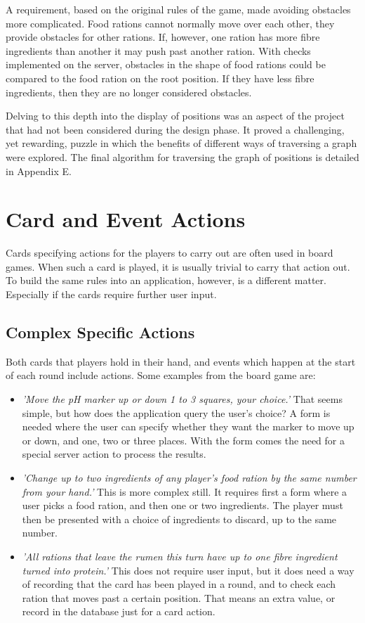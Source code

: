 A requirement, based on the original rules of the game, made avoiding obstacles more complicated. Food rations cannot normally move over each other, they provide obstacles for other rations. If, however, one ration has more fibre ingredients than another it may push past another ration. With checks implemented on the server, obstacles in the shape of food rations could be compared to the food ration on the root position. If they have less fibre ingredients, then they are no longer considered obstacles.

Delving to this depth into the display of positions was an aspect of the project that had not been considered during the design phase. It proved a challenging, yet rewarding, puzzle in which the benefits of different ways of traversing a graph were explored. The final algorithm for traversing the graph of positions is detailed in Appendix E.

\section{Card and Event Actions}
Cards specifying actions for the players to carry out are often used in board games. When such a card is played, it is usually trivial to carry that action out. To build the same rules into an application, however, is a different matter. Especially if the cards require further user input.

\subsection{Complex Specific Actions}
Both cards that players hold in their hand, and events which happen at the start of each round include actions. Some examples from the board game are:
\begin{itemize}
	\item \textit{'Move the pH marker up or down 1 to 3 squares, your choice.'} That seems simple, but how does the application query the user's choice? A form is needed where the user can specify whether they want the marker to move up or down, and one, two or three places. With the form comes the need for a special server action to process the results.
	\item \textit{'Change up to two ingredients of any player's food ration by the same number from your hand.'} This is more complex still. It requires first a form where a user picks a food ration, and then one or two ingredients. The player must then be presented with a choice of ingredients to discard, up to the same number.
	\item \textit{'All rations that leave the rumen this turn have up to one fibre ingredient turned into protein.'}  This does not require user input, but it does need a way of recording that the card has been played in a round, and to check each ration that moves past a certain position. That means an extra value, or record in the database just for a card action.
\end{itemize}
	
